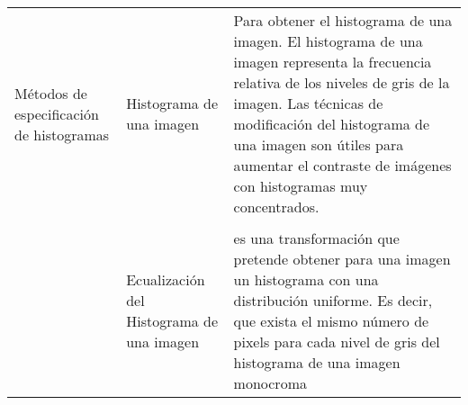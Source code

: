 \documentclass[letterpaper]{article}
\begin{document}
\begin{table}[H]

	\centering
    
	\begin{tabular}[10cm]{ 
    >{\centering\arraybackslash}m{3cm} 
    >{}m{5cm} 
    >{}m{5cm}}
        \midrule 
        
        Métodos de especificación de histogramas 
        
        & Histograma de una imagen &  Para obtener el histograma de una imagen. El histograma de una imagen representa la frecuencia relativa de los niveles de gris de la imagen. Las técnicas de modificación del histograma de una imagen son útiles para aumentar el contraste de imágenes con histogramas muy concentrados.\\ \\
        
        & Ecualización del Histograma de una imagen &  es una transformación que pretende obtener para una imagen un histograma con una distribución uniforme. Es decir, que exista el mismo número de pixels para cada nivel de gris del histograma de una imagen monocroma \\
        
    	\bottomrule
        
	\end{tabular}
    
\end{table}
\end{document}

